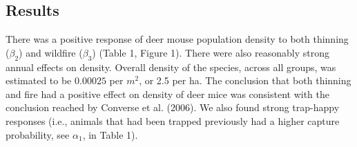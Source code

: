 \subsection{Results}

There was a positive response of deer mouse population density to both
thinning ($\beta_{2}$) and wildfire ($\beta_{3}$) (Table 1, Figure
1). There were also reasonably strong annual effects on
density. Overall density of the species, across all groups, was
estimated to be $0.00025$ per $m^{2}$, or 2.5 per ha. The conclusion
that both thinning and fire had a positive effect on density of
deer mice was consistent with the conclusion reached by Converse et
al. (2006).
We also found strong trap-happy responses (i.e., animals that had been
trapped previously had a higher capture probability, see $\alpha_{1}$,
in Table 1).






